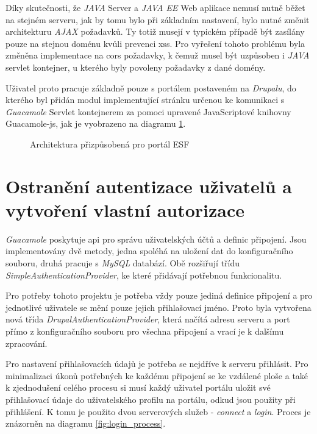 Díky skutečnosti, že \emph{JAVA} Server a \emph{JAVA EE} Web aplikace nemusí nutně běžet na stejném serveru, jak by tomu bylo při základním nastavení, bylo nutné změnit architekturu \emph{AJAX} požadavků. Ty totiž musejí v typickém případě být zasílány pouze na stejnou doménu kvůli prevenci \gls{xss}. Pro vyřešení tohoto problému byla změněna implementace na \gls{cors} požadavky, k čemuž musel být uzpůsoben i \emph{JAVA} \gls{servlet} kontejner, u kterého byly povoleny požadavky z dané domény. 

Uživatel proto pracuje základně pouze s portálem postaveném na \emph{Drupalu}, do kterého byl přidán modul implementující stránku určenou ke komunikaci s \emph{Guacamole} Servlet kontejnerem za pomoci upravené JavaScriptové knihovny Guacamole-js, jak je vyobrazeno na diagramu \ref{fig:arch_drupal}.

\begin{figure}[htp] 
  \caption{Architektura přizpůsobená pro portál ESF}
  \label{fig:arch_drupal}
\end{figure}  

\section{Ostranění autentizace uživatelů a vytvoření vlastní autorizace}
\emph{Guacamole} poskytuje \gls{api} pro správu uživatelských účtů a definic připojení. Jsou implementovány dvě metody, jedna spoléhá na uložení dat do konfiguračního souboru, druhá pracuje s \emph{MySQL} databází. Obě rozšiřují třídu \emph{SimpleAuthenticationProvider}, ke které přidávají potřebnou funkcionalitu. 

Pro potřeby tohoto projektu je potřeba vždy pouze jediná definice připojení a pro jednotlivé uživatele se mění pouze jejich přihlašovací jméno. Proto byla vytvořena nová třída \emph{DrupalAuthenticationProvider}, která načítá adresu serveru a port přímo z konfiguračního souboru pro všechna připojení a vrací je k dalšímu zpracování. 

Pro nastavení přihlašovacích údajů je potřeba se nejdříve k serveru přihlásit. Pro minimalizaci úkonů potřebných ke každému připojení se ke vzdálené ploše a také k zjednodušení celého procesu si musí každý uživatel portálu uložit své přihlašovací údaje do uživatelského profilu na portálu, odkud jsou použity při přihlášení. K tomu je použito dvou serverových služeb - \emph{connect} a \emph{login}. Proces je znázorněn na diagramu \ref{fig:login_process}. 

